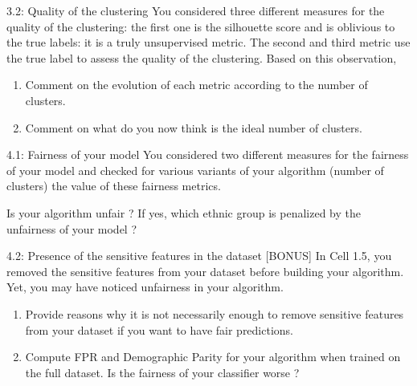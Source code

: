 \documentclass [a4paper, 12pt] {article}
\begin{document}
\begin{question}{3.2: Quality of the clustering}
You considered three different measures for the quality of the clustering: the first one is the silhouette score and is oblivious to the true labels: it is a truly unsupervised metric. The second and third metric use the true label to assess the quality of the clustering. Based on this observation,
\begin{enumerate}
    \item Comment on the evolution of each metric according to the number of clusters.
    \item Comment on what do you now think is the ideal number of clusters.
\end{enumerate}
\end{question}
\begin{answer}\color{blue}
\end{answer}

\begin{question}{4.1: Fairness of your model}
You considered two different measures for the fairness of your model and checked for various variants of your algorithm (number of clusters) the value of these fairness metrics.

Is your algorithm unfair ? If yes, which ethnic group is penalized by the unfairness of your model ?
\end{question}
\begin{answer}\color{blue}
\end{answer}

\begin{question}{4.2: Presence of the sensitive features in the dataset [BONUS]}
In Cell 1.5, you removed the sensitive features from your dataset before building your algorithm. Yet, you may have noticed unfairness in your algorithm.
\begin{enumerate}
    \item Provide reasons why it is not necessarily enough to remove sensitive features from your dataset if you want to have fair predictions.
    \item Compute FPR and Demographic Parity for your algorithm when trained on the full dataset. Is the fairness of your classifier worse ?
\end{enumerate}
\end{question}
\begin{answer}\color{blue}
\end{answer}
\end{document}
